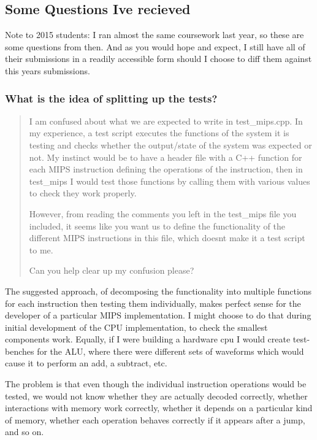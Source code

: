 \subsection*{Some Questions I\textquotesingle{}ve recieved }

Note to 2015 students\+: I ran almost the same coursework last year, so these are some questions from then. And as you would hope and expect, I still have all of their submissions in a readily accessible form should I choose to diff them against this years submissions.

\subsubsection*{What is the idea of splitting up the tests?}

\begin{quote}
I am confused about what we are expected to write in test\+\_\+mips.\+cpp. In my experience, a test script executes the functions of the system it is testing and checks whether the output/state of the system was expected or not. My instinct would be to have a header file with a C++ function for each M\+I\+P\+S instruction defining the operations of the instruction, then in test\+\_\+mips I would test those functions by calling them with various values to check they work properly.

However, from reading the comments you left in the test\+\_\+mips file you included, it seems like you want us to define the functionality of the different M\+I\+P\+S instructions in this file, which doesn\textquotesingle{}t make it a test script to me.

Can you help clear up my confusion please? \end{quote}


The suggested approach, of decomposing the functionality into multiple functions for each instruction then testing them individually, makes perfect sense for the developer of a particular M\+I\+P\+S implementation. I might choose to do that during initial development of the C\+P\+U implementation, to check the smallest components work. Equally, if I were building a hardware cpu I would create test-\/benches for the A\+L\+U, where there were different sets of waveforms which would cause it to perform an add, a subtract, etc.

The problem is that even though the individual instruction operations would be tested, we would not know whether they are actually decoded correctly, whether interactions with memory work correctly, whether it depends on a particular kind of memory, whether each operation behaves correctly if it appears after a jump, and so on.

